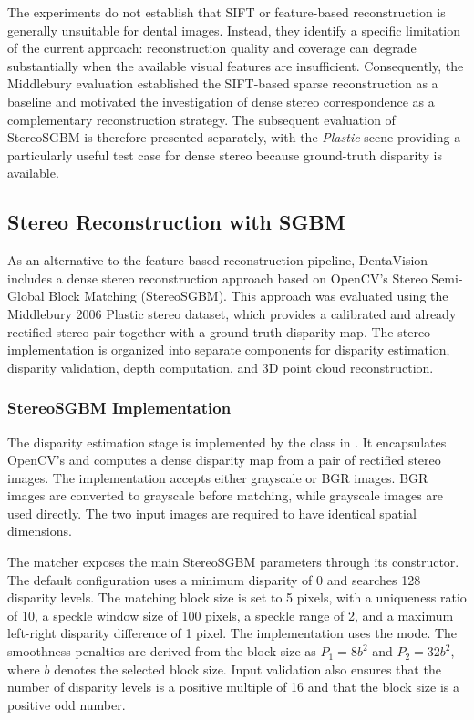 The experiments do not establish that SIFT or feature-based reconstruction is
generally unsuitable for dental images. Instead, they identify a specific
limitation of the current approach: reconstruction quality and coverage can
degrade substantially when the available visual features are insufficient.
Consequently, the Middlebury evaluation established the SIFT-based sparse
reconstruction as a baseline and motivated the investigation of dense stereo
correspondence as a complementary reconstruction strategy. The subsequent
evaluation of StereoSGBM is therefore presented separately, with the
\textit{Plastic} scene providing a particularly useful test case for dense
stereo because ground-truth disparity is available.

\subsection{Stereo Reconstruction with SGBM}

As an alternative to the feature-based reconstruction pipeline, DentaVision includes a dense stereo reconstruction approach based on OpenCV's Stereo Semi-Global Block Matching (StereoSGBM). This approach was evaluated using the Middlebury 2006 Plastic stereo dataset, which provides a calibrated and already rectified stereo pair together with a ground-truth disparity map. The stereo implementation is organized into separate components for disparity estimation, disparity validation, depth computation, and 3D point cloud reconstruction.

\subsubsection{StereoSGBM Implementation}

The disparity estimation stage is implemented by the  class in . It encapsulates OpenCV's  and computes a dense disparity map from a pair of rectified stereo images. The implementation accepts either grayscale or BGR images. BGR images are converted to grayscale before matching, while grayscale images are used directly. The two input images are required to have identical spatial dimensions.

The matcher exposes the main StereoSGBM parameters through its constructor. The default configuration uses a minimum disparity of 0 and searches 128 disparity levels. The matching block size is set to 5 pixels, with a uniqueness ratio of 10, a speckle window size of 100 pixels, a speckle range of 2, and a maximum left-right disparity difference of 1 pixel. The implementation uses the  mode. The smoothness penalties are derived from the block size as \(P_1=8b^2\) and \(P_2=32b^2\), where \(b\) denotes the selected block size. Input validation also ensures that the number of disparity levels is a positive multiple of 16 and that the block size is a positive odd number.

